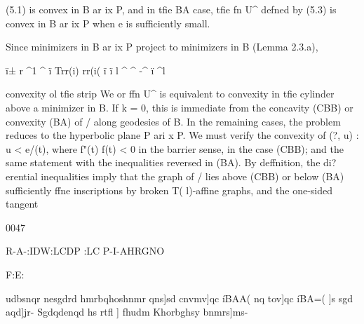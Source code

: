 (5.1) is convex in B ar ix P, and in tfie BA case, tfie fn U^ defned by
(5.3) is convex in B ar ix P when e is sufficiently small.

Since minimizers in B ar ix P project to minimizers in B (Lemma 2.3.a),

ï±        r ^1        ^  ï      Trr(i)                                                                                                                                                  rr(i(   ï                                                                                                       ï     l     ^   ^                                                                                                                                                                   -^      ï     ^l

convexity ol tfie strip We or ffn U^ is equivalent to convexity in tfie
cylinder above a minimizer in B. If k = 0, this is immediate from the
concavity (CBB) or convexity (BA) of / along geodesies of B. In the
remaining cases, the problem reduces to the hyperbolic plane P ari x P.
We must verify the convexity of {(?, u) : u < e/(t)}, where f"(t) f(t) < 0
in the barrier sense, in the case (CBB); and the same statement with the
inequalities reversed in (BA). By deffnition, the di?erential inequalities
imply that the graph of / lies above (CBB) or below (BA) sufficiently
ffne inscriptions by broken T(   l)-affine graphs, and the one-sided tangent

0047

R-A-:IDW:LCDP :LC P-I-AHRGNO

F:E:

udbsnqr nesgdrd hmrbqhoshnmr qns]sd cnvmv]qc íBAA( nq tov]qc íBA=( ]s
sgd aqd]jr- Sgdqdenqd hs rtfl
] fhudm Khorbghsy bnmrs]ms-


